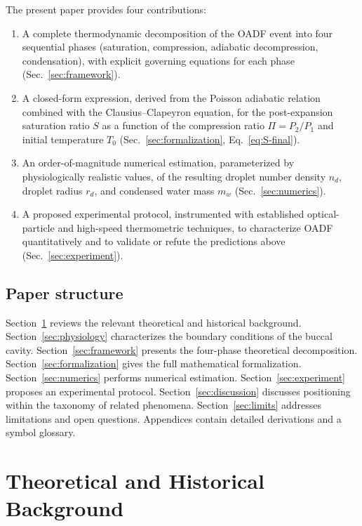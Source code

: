\documentclass[11pt,a4paper]{article}
\theoremstyle{definition}
\theoremstyle{plain}
\begin{document}
The present paper provides four contributions:
\begin{enumerate}
  \item A complete thermodynamic decomposition of the OADF event into four sequential phases (saturation, compression, adiabatic decompression, condensation), with explicit governing equations for each phase (Sec.~\ref{sec:framework}).
  \item A closed-form expression, derived from the Poisson adiabatic relation combined with the Clausius–Clapeyron equation, for the post-expansion saturation ratio $S$ as a function of the compression ratio $\Pi = P_2/P_1$ and initial temperature $T_0$ (Sec.~\ref{sec:formalization}, Eq.~\ref{eq:S-final}).
  \item An order-of-magnitude numerical estimation, parameterized by physiologically realistic values, of the resulting droplet number density $n_d$, droplet radius $r_d$, and condensed water mass $m_w$ (Sec.~\ref{sec:numerics}).
  \item A proposed experimental protocol, instrumented with established optical-particle and high-speed thermometric techniques, to characterize OADF quantitatively and to validate or refute the predictions above (Sec.~\ref{sec:experiment}).
\end{enumerate}

\subsection{Paper structure}
Section~\ref{sec:background} reviews the relevant theoretical and historical background. Section~\ref{sec:physiology} characterizes the boundary conditions of the buccal cavity. Section~\ref{sec:framework} presents the four-phase theoretical decomposition. Section~\ref{sec:formalization} gives the full mathematical formalization. Section~\ref{sec:numerics} performs numerical estimation. Section~\ref{sec:experiment} proposes an experimental protocol. Section~\ref{sec:discussion} discusses positioning within the taxonomy of related phenomena. Section~\ref{sec:limits} addresses limitations and open questions. Appendices contain detailed derivations and a symbol glossary.

\section{Theoretical and Historical Background}
\label{sec:background}
\end{document}
